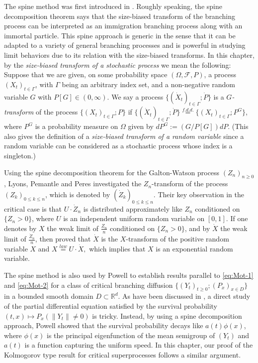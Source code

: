 \documentclass[UTF8]{pkuthss}
\theoremstyle{plain}
\theoremstyle{definition}
\numberwithin{equation}{section}
\begin{document}
The spine method was first introduced in \cite{LyonsPemantlePeres1995Conceptual}.
	Roughly speaking, the spine decomposition theorem says that the size-biased transform of the branching process can be interpreted as an immigration branching process along with an immortal particle.
	This spine approach is generic in the sense that it can be adapted to a variety of general branching processes and is powerful in studying limit behaviors due to its relation with the size-biased transforms.
	In this chapter, by the \emph{size-biased transform of a stochastic process} we mean the following:
Suppose that we are given, on some probability space $(\Omega,\mathscr F,P)$, a process $(X_t)_{t\in \Gamma}$, with $\Gamma$ being an arbitrary index set, and a non-negative random variable $G$ with $ P[G] \in (0,\infty)$.
	We say a process $\{(\dot X_t)_{t\in \Gamma}; \dot P\}$ is a \emph{$G$-transform} of the process $\{(X_t)_{t\in \Gamma}; P\}$ if $\{(\dot X_t)_{t\in \Gamma}; \dot P\} \overset{f.d.d.}{=} \{(X_t)_{t\in \Gamma}; P^G\}$, where $P^G$ is a probability  measure on $\Omega$ given by $dP^G := (G/P[G]) dP$. 
	(This also gives the definition of a \emph{size-biased transform of a random variable} since a random variable can be considered as a stochastic process 
whose index is a singleton.)

	Using the spine decomposition theorem for the Galton-Watson process $(Z_n)_{n\geq 0}$, Lyons, Pemantle and Peres \cite{LyonsPemantlePeres1995Conceptual} investigated the $Z_n$-transform of the process $(Z_k)_{0\leq k\leq n}$, which is denoted by $(\dot Z_k)_{0\leq k\leq n}$.
	Their key observation in the critical case is that $U\cdot \dot Z_n$ is distributed approximately like $Z_n$ conditioned on $\{Z_n > 0\}$, where $U$ is an independent uniform random variable on $[0,1]$.
	If one denotes by $X$ the weak limit of $\frac{Z_n}{n}$ conditioned on $\{Z_n > 0\}$, and by $\dot X$  the weak limit of $\frac{\dot Z_n}{n}$, then \cite{LyonsPemantlePeres1995Conceptual} proved that $\dot X$ is the $X$-transform of the positive random variable $X$ and
$X\overset{law}{=} U \cdot \dot X,$
	which implies that $X$ is an exponential random variable.

    The spine method is also used by Powell \cite{Powell2016An-invariance}
	to establish results parallel to \eqref{eq:Mot-1} and \eqref{eq:Mot-2} for a class of critical branching diffusion $\{(Y_t)_{t\geq 0}; (P_x)_{x\in D}\}$ in a bounded smooth domain $D\subset \mathbb R^d$.
	As have been discussed in \cite{Powell2016An-invariance}, a direct study of the partial differential equation satisfied by the survival probability $(t,x) \mapsto P_{x}(\|Y_t\| \neq 0)$ is tricky.
	Instead, by using a spine decomposition approach, Powell \cite{Powell2016An-invariance} showed that the survival probability decays like $a(t)\phi(x)$, where $\phi(x)$ is the principal eigenfunction of the mean semigroup of $(Y_t)$ and $a(t)$ is a function capturing the uniform speed.
	In this chapter, our proof of the Kolmogorov type result 
   for critical superprocesses follows a similar argument.
\end{document}
